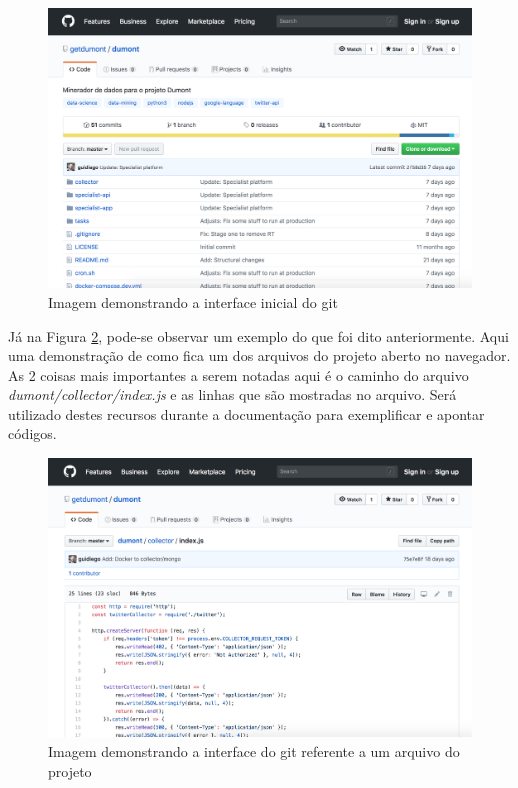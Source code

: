 \begin{figure}[!ht]
    \centering
    \includegraphics[width=.75\textwidth]{imagens/git_init.png}
    \caption{Imagem demonstrando a interface inicial do git}
    \label{fig:git_init}
\end{figure}

Já na Figura \ref{fig:git_file}, pode-se observar um exemplo do que foi dito anteriormente. Aqui uma demonstração de como fica um dos arquivos do projeto aberto no navegador. As 2 coisas mais importantes a serem notadas aqui é o caminho do arquivo \textit{dumont/collector/index.js} e as linhas que são mostradas no arquivo. Será utilizado destes recursos durante a documentação para exemplificar e apontar códigos.

\begin{figure}[!ht]
    \centering
    \includegraphics[width=.8\textwidth]{imagens/git_file.png}
    \caption{Imagem demonstrando a interface do git referente a um arquivo do projeto}
    \label{fig:git_file}
\end{figure}
